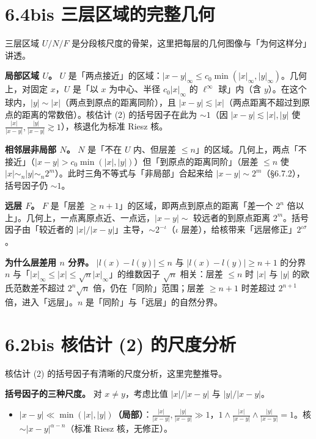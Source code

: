 \documentclass[a4paper,11pt,openany]{ctexbook}
\numberwithin{equation}{chapter}
\numberwithin{figure}{chapter}
\numberwithin{table}{chapter}
\begin{document}
\section{6.4bis 三层区域的完整几何}

三层区域 $U/N/F$ 是分段核尺度的骨架，这里把每层的几何图像与「为何这样分」讲透。

\textbf{局部区域 $U$。} $U$ 是「两点接近」的区域：$|x-y|_\infty\le c_0\min(|x|_\infty,|y|_\infty)$。几何上，对固定 $x$，$U$ 是「以 $x$ 为中心、半径 $c_0|x|_\infty$ 的 $\ell^\infty$ 球」内（含 $y$）。在这个球内，$|y|\sim|x|$（两点到原点的距离同阶），且 $|x-y|\lesssim|x|$（两点距离不超过到原点的距离的常数倍）。核估计 (2) 的括号因子在此为 $\sim1$（因 $|x-y|\lesssim|x|,|y|$ 使 $\frac{|x|}{|x-y|},\frac{|y|}{|x-y|}\gtrsim1$），核退化为标准 Riesz 核。

\textbf{相邻层非局部 $N$。} $N$ 是「不在 $U$ 内、但层差 $\le n$」的区域。几何上，两点「不接近」（$|x-y|>c_0\min(|x|,|y|)$）但「到原点的距离同阶」（层差 $\le n$ 使 $|x|\sim_n|y|\sim_n2^{m}$）。此时三角不等式与「非局部」合起来给 $|x-y|\sim2^{m}$（§6.7.2），括号因子仍 $\sim1$。

\textbf{远层 $F$。} $F$ 是「层差 $\ge n+1$」的区域，即两点到原点的距离「差一个 $2^n$ 倍以上」。几何上，一点离原点近、一点远，$|x-y|\sim$ 较远者的到原点距离 $2^{m}$。括号因子由「较近者的 $|x|/|x-y|$」主导，$\sim2^{-\iota}$（$\iota$ 层差），给核带来「远层修正」$2^{\iota\sigma}$。

\textbf{为什么层差用 $n$ 分界。} $|l(x)-l(y)|\le n$ 与 $|l(x)-l(y)|\ge n+1$ 的分界 $n$ 与「$|x|_\infty\le|x|\le\sqrt n|x|_\infty$」的维数因子 $\sqrt n$ 相关：层差 $\le n$ 时 $|x|$ 与 $|y|$ 的欧氏范数差不超过 $2^n\sqrt n$ 倍，仍在「同阶」范围；层差 $\ge n+1$ 时差超过 $2^{n+1}$ 倍，进入「远层」。$n$ 是「同阶」与「远层」的自然分界。

\section{6.2bis 核估计 (2) 的尺度分析}

核估计 (2) 的括号因子有清晰的尺度分析，这里完整推导。

\textbf{括号因子的三种尺度。} 对 $x\neq y$，考虑比值 $|x|/|x-y|$ 与 $|y|/|x-y|$。

\begin{itemize}
\item \textbf{$|x-y|\ll\min(|x|,|y|)$（局部）}：$\frac{|x|}{|x-y|},\frac{|y|}{|x-y|}\gg1$，$1\wedge\frac{|x|}{|x-y|}\wedge\frac{|y|}{|x-y|}=1$。核 $\sim|x-y|^{\alpha-n}$（标准 Riesz 核，无修正）。
\end{itemize}
\end{document}
